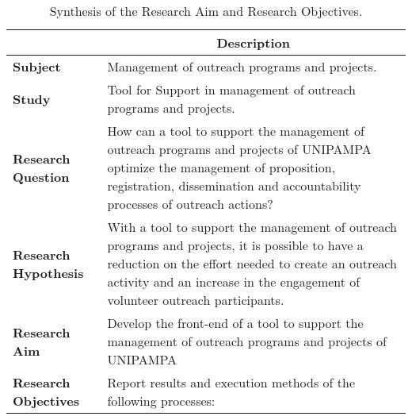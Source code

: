 \begin{table}[!htb]
  \centering
  \caption{Synthesis of the Research Aim and Research Objectives.}
  \label{tbl:intro-objectives}
  \footnotesize
  \begin{tabular}{l|p{11cm}}
    \bottomrule
    \rowcolor[rgb]{0.749,0.749,0.749} \multicolumn{1}{c|}{\textbf{Topic}}                  & \multicolumn{1}{c}{\textbf{Description}}                                                                                                                                                                                              \\
    \hline
    \rowcolor[rgb]{0.898,0.898,0.898} \textcolor[rgb]{0.145,0.145,0.145}{\textbf{Subject}} & Management of outreach programs and projects.                                                                                                                                                                                         \\
    \textbf{Study}                                                                         & Tool for Support in management of outreach programs and projects.                                                                                                                                                                     \\
    \rowcolor[rgb]{0.898,0.898,0.898} \textbf{Research Question}                           & How can a tool to support the management of outreach programs and projects of \acs{UNIPAMPA} optimize the management of proposition, registration, dissemination and accountability processes of outreach actions?                    \\
    \textcolor[rgb]{0.145,0.145,0.145}{\textbf{Research Hypothesis}}                       & With a tool to support the management of outreach programs and projects, it is possible to have a reduction on the effort needed to create an outreach activity and an increase in the engagement of volunteer outreach participants. \\
    \rowcolor[rgb]{0.898,0.898,0.898} \textbf{Research Aim}                                & Develop the front-end of a tool to support the management of outreach programs and projects of \acs{UNIPAMPA}                                                                                                                         \\
    \textbf{Research Objectives}                                                           & Report results and execution methods of the following processes:

\end{tabular}
\end{table}
